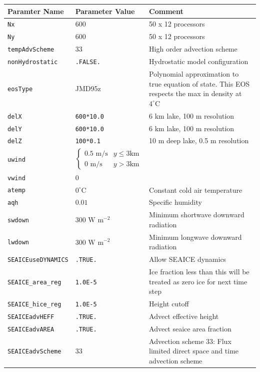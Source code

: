 \documentclass[11pt]{article}
\begin{document}
\begin{longtable}{  p{}  p{}  p{}  }
\hline
\textbf{Paramter Name} & \textbf{Parameter Value} & \textbf{Comment} \\ \hline \hline
\verb|Nx| & 600 & 50 x 12 processors \\ \hline
\verb|Ny| & 600 & 50 x 12 processors \\ \hline
\verb|tempAdvScheme|	&	33	&	High order advection scheme \\ \hline
\verb|nonHydrostatic| & \verb|.FALSE.| & Hydrostatic model configuration \\ \hline
\verb|eosType|		&	JMD95z	&	Polynomial approximation to true equation of state. This EOS respects the max in density at $4^{\circ} \textrm{C}$\\ \hline
\verb|delX|			&	\verb|600*10.0|	&	6 km lake, 100 m resolution \\ \hline
\verb|delY|			&	\verb|600*10.0|	&	6 km lake, 100 m resolution \\ \hline
\verb|delZ|			&	\verb|100*0.1 |	&	10 m deep lake, 0.5 m resolution \\ \hline

\verb|uwind|		&	\begin{equation*} \begin{cases} 0.5 \text{ m/s} & y \leq 3 \text{km} \\ 0 \text{ m/s} & y > 3 \text{km}   \end{cases} \end{equation*} & \\ \hline
\verb|vwind| 	& 0	& \\ \hline
\verb|atemp| 	& $0^{\circ} \text{C}$		& Constant cold air temperature \\ \hline
\verb|aqh| 		& $0.01$		&	Specific humidity \\ \hline
\verb|swdown| 	& $300 \text{ W} \text{ m}^{-2}$	& Minimum shortwave downward radiation \\ \hline
\verb|lwdown| 	& $300 \text{ W} \text{ m}^{-2}$	& Minimum longwave downward radiation \\ \hline

\verb|SEAICEuseDYNAMICS| & \verb|.TRUE.| & Allow SEAICE dynamics \\ \hline
\verb|SEAICE_area_reg|   & \verb|1.0E-5| & Ice fraction less than this will be treated as zero ice for next time step \\ \hline
\verb|SEAICE_hice_reg|   & \verb|1.0E-5| & Height cutoff \\ \hline
\verb|SEAICEadvHEFF|     & \verb|.TRUE.| & Advect effective height \\ \hline
\verb|SEAICEadvAREA|     & \verb|.TRUE.| & Advect seaice area fraction \\ \hline
\verb|SEAICEadvScheme|   & $33$			& Advection scheme 33: Flux limited direct space and time advection scheme \\ \hline


\end{longtable}
\end{document}
